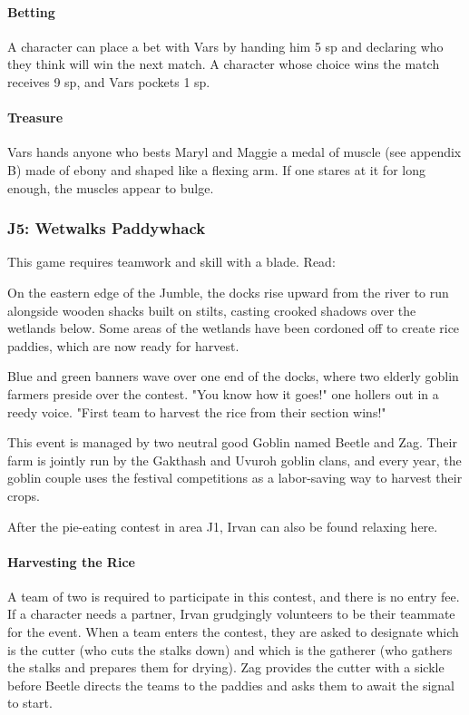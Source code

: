 \documentclass[10pt,a4paper,twoside,bg=print,twocolumn,openany,nodeprecatedcode]{dndbook}
\begin{document}
\paragraph{Betting}
A character can place a bet with Vars by handing him 5 sp and declaring who they think will win the next match. A character whose choice wins the match receives 9 sp, and Vars pockets 1 sp.

\paragraph{Treasure}
Vars hands anyone who bests Maryl and Maggie a medal of muscle (see appendix B) made of ebony and shaped like a flexing arm. If one stares at it for long enough, the muscles appear to bulge.

\subsubsection{J5: Wetwalks Paddywhack}
This game requires teamwork and skill with a blade. Read:

\begin{DndReadAloud}{}
On the eastern edge of the Jumble, the docks rise upward from the river to run alongside wooden shacks built on stilts, casting crooked shadows over the wetlands below. Some areas of the wetlands have been cordoned off to create rice paddies, which are now ready for harvest.

Blue and green banners wave over one end of the docks, where two elderly goblin farmers preside over the contest. "You know how it goes!" one hollers out in a reedy voice. "First team to harvest the rice from their section wins!"

\end{DndReadAloud}

This event is managed by two neutral good Goblin named Beetle and Zag. Their farm is jointly run by the Gakthash and Uvuroh goblin clans, and every year, the goblin couple uses the festival competitions as a labor-saving way to harvest their crops.

After the pie-eating contest in area J1, Irvan can also be found relaxing here.

\paragraph{Harvesting the Rice}
A team of two is required to participate in this contest, and there is no entry fee. If a character needs a partner, Irvan grudgingly volunteers to be their teammate for the event. When a team enters the contest, they are asked to designate which is the cutter (who cuts the stalks down) and which is the gatherer (who gathers the stalks and prepares them for drying). Zag provides the cutter with a sickle before Beetle directs the teams to the paddies and asks them to await the signal to start.
\end{document}
